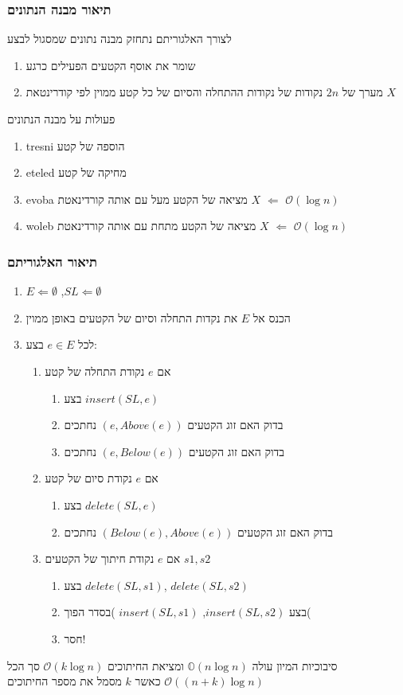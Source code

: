 \documentclass{article}
\makeatletter
\newcommand*{\saved@uline}{}
\let\saved@uline\uline
\newcommand*{\mathuline}{%
  \mathpalette{\math@uline\saved@uline}%
}
\newcommand*{\math@uline}[3]{%
  \mbox{#1{$#2#3\m@th$}}%
}
\renewcommand*{\uline}{%
  \relax  
  \ifmmode
    \expandafter\mathuline
  \else
    \expandafter\saved@uline
  \fi
}
\makeatother
\begin{document}
\subsubsection{תיאור מבנה הנתונים}
\noindent לצורך האלגוריתם נתחזק מבנה נתונים שמסגול לבצע
\begin{enumerate}
\item שומר את אוסף הקטעים הפעילים כרגע
\item מערך של $2n$ נקודות של נקודות ההתחלה והסיום של כל קטע ממוין לפי קודרינטאת $X$
\end{enumerate}
\uline{פעולות על מבנה הנתונים}  
\begin{enumerate}
\item\uline{tresni} הוספה של קטע 
\item\uline{eteled} מחיקה של קטע 
\item\uline{evoba} מציאה של הקטע מעל עם אותה קורדינאטת $X$ $\Leftarrow$ $\mathcal{O}(\log n)$ 
\item\uline{woleb} מציאה של הקטע מתחת עם אותה קורדינאטת $X$ $\Leftarrow$ $\mathcal{O}(\log n)$
\end{enumerate}
\subsubsection{תיאור האלגוריתם} 
\begin{enumerate}[label=\textbf{\arabic*}.]
\item $E\Leftarrow\emptyset$ ,$SL\Leftarrow\emptyset$
\item הכנס אל  $E$ את נקדות התחלה וסיום של הקטעים באופן ממוין
\item לכל $e \in E$ בצע:
\begin{enumerate} [)a(]
\item אם $e$ נקודת התחלה של קטע 
\begin{enumerate}
\item בצע $insert(SL,e)$ 
\item בדוק האם זוג הקטעים $(e,Above(e))$ נחתכים 
\item בדוק האם זוג הקטעים $(e,Below(e))$ נחתכים 
\end{enumerate}
\item אם $e$ נקודת סיום של קטע 
\begin{enumerate}
\item בצע $delete(SL,e)$
\item בדוק האם זוג הקטעים $(Below(e),Above(e))$ נחתכים 
\end{enumerate}
\item אם $e$ נקודת חיתוך של הקטעים $s1,s2$ 
\begin{enumerate}
\item בצע $delete(SL,s1)$, $delete(SL,s2)$
\item בצע $insert(SL,s2)$, $insert(SL,s1)$ )בסדר הפוך(
\item חסר! 
\end{enumerate}
\end{enumerate}
\end{enumerate}
\uline{סיבוכיות} המיון עולה $\mathbb{O}(n \log n)$ ומציאת החיתוכים $\mathcal{O}(k\log n)$ סך הכל $\mathcal{O}((n+k)\log n)$ כאשר $k$ מסמל את מספר החיתוכים
\end{document}
